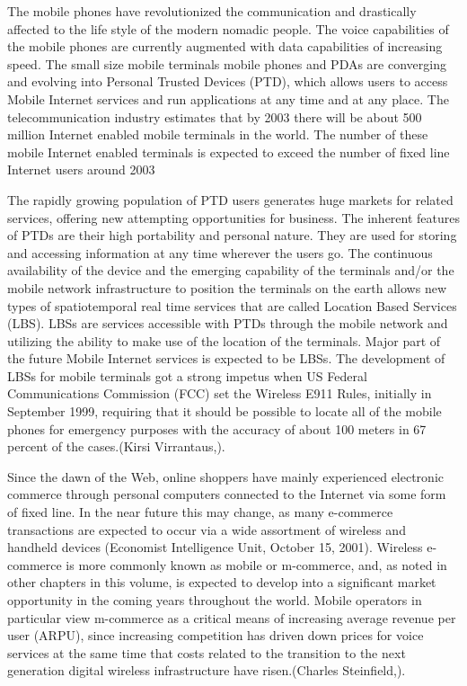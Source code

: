 \documentclass[11pt]{article}
\begin{document}
The mobile phones have revolutionized the communication and drastically affected to the life style of the modern nomadic people.  The voice capabilities of the mobile phones are currently augmented with data capabilities of increasing speed. The small size mobile terminals  mobile phones and PDAs are converging and evolving into Personal  Trusted  Devices  (PTD),  which  allows  users  to  access  Mobile  Internet services  and  run  applications  at  any  time  and  at  any  place.  The telecommunication 
industry  estimates  that  by  2003  there  will  be  about  500  million  Internet enabled mobile terminals in the world. The number of these mobile Internet enabled terminals is  expected  to  exceed  the  number  of  fixed  line  Internet  users  around  2003

The rapidly growing population of PTD users generates huge markets for related services, offering new attempting opportunities for business. The inherent features of PTDs are their high portability and personal nature. They are used  for  storing  and  accessing  information  at  any  time  wherever  the  users  go.  The continuous  availability  of  the  device  and  the  emerging  capability  of  the  terminals and/or the mobile network infrastructure to position the terminals on the earth allows new  types  of  spatiotemporal  real time  services  that  are  called  Location Based Services (LBS). LBSs are services accessible with PTDs through the mobile network and utilizing the ability to make use of the location of the terminals. Major part of the future Mobile Internet services is expected to be LBSs. The development of LBSs for mobile terminals got a strong impetus when US Federal Communications   Commission   (FCC)   set   the   Wireless   E911   Rules,   initially   in September 1999, requiring that it should be possible to locate all of the mobile phones for emergency purposes with the accuracy of about 100 meters in 67 percent of the cases.(Kirsi  Virrantaus,).\cite{hengshan6finding}

Since the dawn of the Web, online shoppers have mainly experienced electronic commerce through personal computers connected to the Internet via some form of fixed line. In the near future this may change, as many e-commerce transactions are expected to occur via a wide assortment of wireless and handheld devices (Economist Intelligence Unit, October 15, 2001). Wireless e-commerce is more commonly known as mobile or m-commerce, and, as noted in other chapters in this volume, is expected to develop into a significant market opportunity in the coming years throughout the world. Mobile operators in particular view m-commerce as a critical means of increasing average revenue per user (ARPU), since increasing competition has driven down prices for voice services at the same time that costs related to the transition to the next generation digital wireless infrastructure have risen.(Charles Steinfield,).
\end{document}
